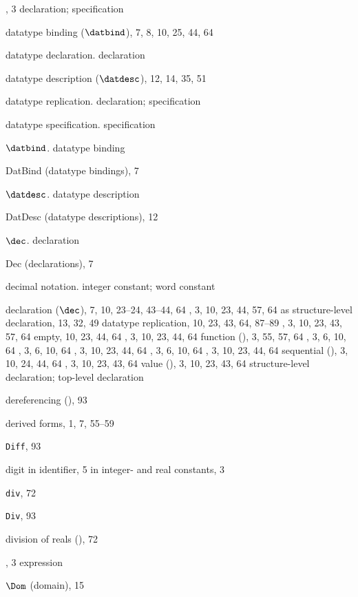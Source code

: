 \begin{theindex}
\item \DATATYPE, 3
\subitem \seealso declaration; specification
\item datatype binding ($\datbind$), 7, 8, 10, 25, 44, 64
\item datatype declaration. \see declaration
\item datatype description ($\datdesc$), 12, 14, 35, 51
\item datatype replication. \see declaration; specification
\item datatype specification. \see specification
\item $\datbind$. \see datatype binding
\item DatBind (datatype bindings), 7
\item $\datdesc$. \see datatype description
\item DatDesc (datatype descriptions), 12
\item $\dec$. \see declaration
\item Dec (declarations), 7
\item decimal notation. \see integer constant; word constant
\item declaration ($\dec$), 7, 10, 23--24, 43--44, 64
\subitem {}, 3, 10, 23, 44, 57, 64
\subitem as structure-level declaration, 13, 32, 49
\subitem datatype replication, 10, 23, 43, 64, 87--89
\subitem {}, 3, 10, 23, 43, 57, 64
\subitem empty, 10, 23, 44, 64
\subitem {}, 3, 10, 23, 44, 64
\subitem function (), 3, 55, 57, 64
\subitem {}, 3, 6, 10, 64
\subitem {}, 3, 6, 10, 64
\subitem {}, 3, 10, 23, 44, 64
\subitem {}, 3, 6, 10, 64
\subitem {}, 3, 10, 23, 44, 64
\subitem sequential (\boxml{;}), 3, 10, 24, 44, 64
\subitem {}, 3, 10, 23, 43, 64
\subitem value (), 3, 10, 23, 43, 64
\subitem \seealso structure-level declaration; top-level declaration
\item dereferencing (\ml{!}), 93
\item derived forms, 1, 7, 55--59
\item {\tt Diff}, 93
\item digit
\subitem in identifier, 5
\subitem in integer- and real constants, 3
\item {\tt div}, 72
\item {\tt Div}, 93
\item division of reals (\ml{/}), 72
\item \DO, 3
\subitem \seealso expression
\item $\Dom$ (domain), 15

\end{theindex}
